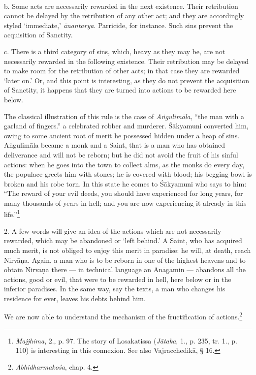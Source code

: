 \documentclass[a4paper, 11pt, oneside, english, landscape]{article}
\begin{document}
\paragraph{}
b. Some acts are necessarily rewarded in the next existence. Their retribution cannot be delayed by the retribution of any other act; and they are accordingly styled `immediate,' \emph{ānantarya}. Parricide, for instance. Such sins prevent the acquisition of Sanctity.

c. There is a third category of sins, which, heavy as they may be, are not necessarily rewarded in the following existence. Their retribution may be delayed to make room for the retribution of other acts; in that case they are rewarded `later on.' Or, and this point is interesting, as they do not prevent the acquisition of Sanctity, it happens that they are turned into actions to be rewarded here below.

The classical illustration of this rule is the case of \emph{Aṅgulimāla}, ``the man with a garland of fingers.'' a celebrated robber and murderer. Śākyamuni converted him, owing to some ancient root of merit he possessed hidden under a heap of sins. Aṅgulimāla became a monk and a Saint, that is a man who has obtained deliverance and will not be reborn; but he did not avoid the fruit of his sinful actions: when he goes into the town to collect alms, as the monks do every day, the populace greets him with stones; he is covered with blood; his begging bowl is broken and his robe torn. In this state he comes to Śākyamuni who says to him: ``The reward of your evil deeds, you should have experienced for long years, for many thousands of years in hell; and you are now experiencing it already in this life.''\footnote{\emph{Majjhima}, 2., p. 97. The story of Losakatissa (\emph{Jātaka}, 1., p. 235, tr. 1., p. 110) is interesting in this connexion. See also Vajracchedikā, § 16.}

2. A few words will give an idea of the actions which are not necessarily rewarded, which may be abandoned or `left behind.' A Saint, who has acquired much merit, is not obliged to enjoy this merit in paradise: he will, at death, reach Nirvāṇa. Again, a man who is to be reborn in one of the highest heavens and to obtain Nirvāṇa there --- in technical language an Anāgāmin --- abandons all the actions, good or evil, that were to be rewarded in hell, here below or in the inferior paradises. In the same way, say the texts, a man who changes his residence for ever, leaves his debts behind him.

We are now able to understand the mechanism of the fructification of actions.\footnote{\emph{Abhidharmakośa}, chap. 4.}
\end{document}
